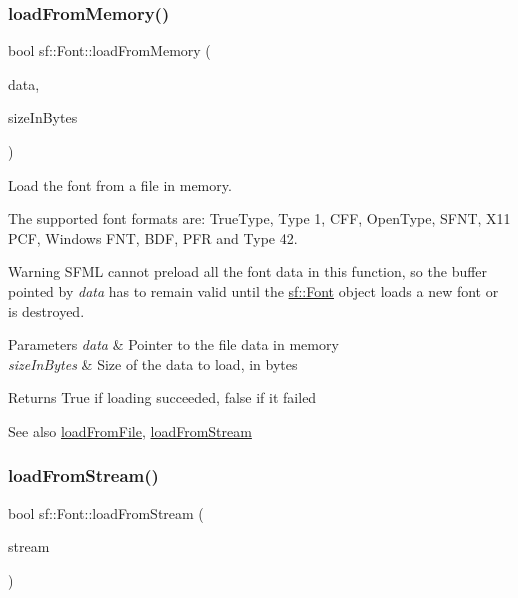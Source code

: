 \subsubsection{\texorpdfstring{load\+From\+Memory()}{loadFromMemory()}}
{\footnotesize\ttfamily bool sf\+::\+Font\+::load\+From\+Memory (\begin{DoxyParamCaption}\item[{const void $\ast$}]{data,  }\item[{std\+::size\+\_\+t}]{size\+In\+Bytes }\end{DoxyParamCaption})}



Load the font from a file in memory. 

The supported font formats are\+: True\+Type, Type 1, C\+FF, Open\+Type, S\+F\+NT, X11 P\+CF, Windows F\+NT, B\+DF, P\+FR and Type 42.

\begin{DoxyWarning}{Warning}
S\+F\+ML cannot preload all the font data in this function, so the buffer pointed by {\itshape data} has to remain valid until the \hyperlink{classsf_1_1_font}{sf\+::\+Font} object loads a new font or is destroyed.
\end{DoxyWarning}

\begin{DoxyParams}{Parameters}
{\em data} & Pointer to the file data in memory \\
\hline
{\em size\+In\+Bytes} & Size of the data to load, in bytes\\
\hline
\end{DoxyParams}
\begin{DoxyReturn}{Returns}
True if loading succeeded, false if it failed
\end{DoxyReturn}
\begin{DoxySeeAlso}{See also}
\hyperlink{classsf_1_1_font_ab020052ef4e01f6c749a85571c0f3fd1}{load\+From\+File}, \hyperlink{classsf_1_1_font_abc3f37a354ce8b9a21f8eb93bd9fdafb}{load\+From\+Stream} 
\end{DoxySeeAlso}
\mbox{\label{classsf_1_1_font_abc3f37a354ce8b9a21f8eb93bd9fdafb}} 
\subsubsection{\texorpdfstring{load\+From\+Stream()}{loadFromStream()}}
{\footnotesize\ttfamily bool sf\+::\+Font\+::load\+From\+Stream (\begin{DoxyParamCaption}\item[{\hyperlink{classsf_1_1_input_stream}{Input\+Stream} \&}]{stream }\end{DoxyParamCaption})}



